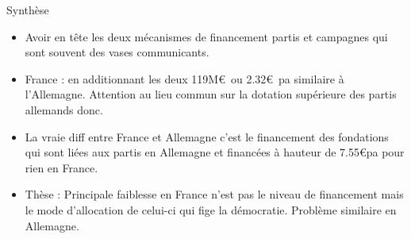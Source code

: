 \documentclass[10pt,t]{beamer}
\begin{document}
\begin{frame}{Synthèse}
    \begin{itemize}
        \item Avoir en tête les deux mécanismes de financement partis et campagnes qui sont souvent des vases communicants.
        \item {France} : en additionnant les deux 119M\euro\ ou 2.32\euro\ pa similaire à l'Allemagne. Attention au lieu commun sur la dotation supérieure des partis allemands donc.
        \item La vraie diff entre France et Allemagne c'est le financement des fondations qui sont liées aux partis en Allemagne et financées à hauteur de 7.55\euro pa pour rien en France.
        \item \alert{Thèse} : Principale faiblesse en France n'est pas le niveau de financement mais le mode d'allocation de celui-ci qui \alert{fige la démocratie}. Problème similaire en Allemagne. 
    \end{itemize}
\end{frame}
\end{document}
